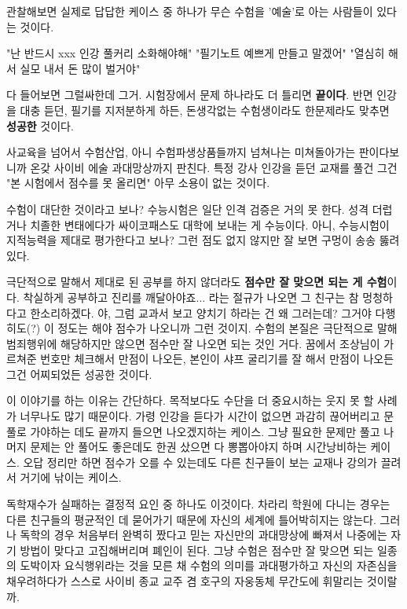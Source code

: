 관찰해보면 실제로 답답한 케이스 중 하나가 무슨 수험을 '예술'로 아는 사람들이 있다는 것이다.
\vspace{5mm}

"난 반드시 xxx 인강 풀커리 소화해야해"
"필기노트 예쁘게 만들고 말겠어"
"열심히 해서 실모 내서 돈 많이 벌거야"
\vspace{5mm}

다 들어보면 그럴싸한데 그거. 시험장에서 문제 하나라도 더 틀리면 \textbf{끝이다}.
반면 인강을 대충 듣던, 필기를 지저분하게 하든, 돈생각없는 수험생이라도 한문제라도 맞추면 \textbf{성공한} 것이다.
\vspace{5mm}

사교육을 넘어서 수험산업, 아니 수험파생상품들까지 넘쳐나는 미쳐돌아가는 판이다보니까 온갖 사이비 에술 과대망상까지 판친다.
특정 강사 인강을 듣던 교재를 풀건 그건 "본 시험에서 점수를 못 올리면" 아무 소용이 없는 것이다.
\vspace{5mm}

수험이 대단한 것이라고 보나?
수능시험은 일단 인격 검증은 거의 못 한다. 성격 더럽거나 치졸한 변태에다가 싸이코패스도 대학에 보내는 게 수능이다.
아니, 수능시험이 지적능력을 제대로 평가한다고 보나? 그런 점도 없지 않지만 잘 보면 구멍이 송송 뚫려있다.
\vspace{5mm}

극단적으로 말해서 제대로 된 공부를 하지 않더라도 \textbf{점수만 잘 맞으면 되는 게 수험}이다.
착실하게 공부하고 진리를 깨달아야죠... 라는 절규가 나오면 그 친구는 참 멍청하다고 한소리하겠다.
야, 그럼 교과서 보고 양치기 하라는 건 왜 그러는데? 그거야 다행히도(?) 이 정도는 해야 점수가 나오니까 그런 것이지.
수험의 본질은 극단적으로 말해 범죄행위에 해당하지만 않으면 점수만 잘 나오면 되는 것인 거다.
꿈에서 조상님이 가르쳐준 번호만 체크해서 만점이 나오든, 본인이 샤프 굴리기를 잘 해서 만점이 나오든 그건 어찌되었든 성공한 것이다.
\vspace{5mm}

이 이야기를 하는 이유는 간단하다.
목적보다도 수단을 더 중요시하는 웃지 못 할 사례가 너무나도 많기 때문이다.
가령 인강을 듣다가 시간이 없으면 과감히 끊어버리고 문풀로 가야하는 데도 끝까지 들으면 나오겠지하는 케이스.
그냥 필요한 문제만 풀고 나머지 문제는 안 풀어도 좋은데도 한권 샀으면 다 뽕뽑아야지 하며 시간낭비하는 케이스.
오답 정리만 하면 점수가 오를 수 있는데도 다른 친구들이 보는 교재나 강의가 끌려서 거기에 낚이는 케이스.
\vspace{5mm}

독학재수가 실패하는 결정적 요인 중 하나도 이것이다.
차라리 학원에 다니는 경우는 다른 친구들의 평균적인 데 묻어가기 때문에 자신의 세계에 틀어박히지는 않는다.
그러나 독학의 경우 처음부터 완벽히 짰다고 믿는 자신만의 과대망상에 빠져서 나중에는 자기 방법이 맞다고 고집해버리며 폐인이 된다.
그냥 수험은 점수만 잘 맞으면 되는 일종의 도박이자 요식행위라는 것을 모른 채
수험의 의미를 과대평가하고 자신의 자존심을 채우려하다가 스스로 사이비 종교 교주 겸 호구의 자웅동체 무간도에 휘말리는 것이랄까.
\vspace{5mm}

